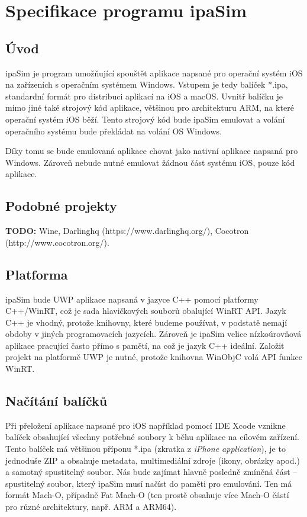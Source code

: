 \documentclass[12pt]{article}
\begin{document}
\section*{Specifikace programu ipaSim}

\subsection*{Úvod}

ipaSim je program umožňující spouštět aplikace napsané pro operační systém iOS na zařízeních s operačním systémem Windows.
Vstupem je tedy balíček *.ipa, standardní formát pro distribuci aplikací na iOS a macOS.
Uvnitř balíčku je mimo jiné také strojový kód aplikace, většinou pro architekturu ARM, na které operační systém iOS běží.
Tento strojový kód bude ipaSim emulovat a volání operačního systému bude překládat na volání OS Windows.

Díky tomu se bude emulovaná aplikace chovat jako nativní aplikace napsaná pro Windows.
Zároveň nebude nutné emulovat žádnou část systému iOS, pouze kód aplikace.

\subsection*{Podobné projekty}

\textbf{TODO:} Wine, Darlinghq (https://www.darlinghq.org/), Cocotron (http://www.cocotron.org/).

\subsection*{Platforma}

ipaSim bude UWP aplikace napsaná v jazyce C++ pomocí platformy C++/WinRT, což je sada hlavičkových souborů obalující WinRT API.
Jazyk C++ je vhodný, protože knihovny, které budeme používat, v podstatě nemají obdoby v jiných programovacích jazycích.
Zároveň je ipaSim velice nízkoúrovňová aplikace pracující často přímo s pamětí, na což je jazyk C++ ideální.
Založit projekt na platformě UWP je nutné, protože knihovna WinObjC volá API funkce WinRT.

\subsection*{Načítání balíčků}

Při přeložení aplikace napsané pro iOS například pomocí IDE Xcode vznikne balíček obsahující všechny potřebné soubory k běhu aplikace na cílovém zařízení.
Tento balíček má většinou příponu *.ipa (zkratka z \textit{iPhone application}), je to jednoduše ZIP a obsahuje metadata, multimediální zdroje (ikony, obrázky apod.) a samotný spustitelný soubor.
Nás bude zajímat hlavně posledně zmíněná část -- spustitelný soubor, který ipaSim musí načíst do paměti pro emulování.
Ten má formát Mach-O, případně Fat Mach-O (ten prostě obsahuje více Mach-O částí pro různé architektury, např. ARM a ARM64).
\end{document}
